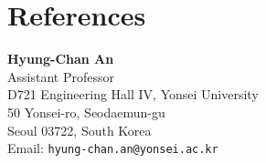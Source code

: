 \documentclass{cv}
\begin{document}
\section{References}
\parbox{0.5\textwidth}{
\textbf{Hyung-Chan An}\\
Assistant Professor \\
D721 Engineering Hall IV, Yonsei University \\
50 Yonsei-ro, Seodaemun-gu \\
Seoul 03722, South Korea\\
Email: \texttt{hyung-chan.an@yonsei.ac.kr}
}
\end{document}
